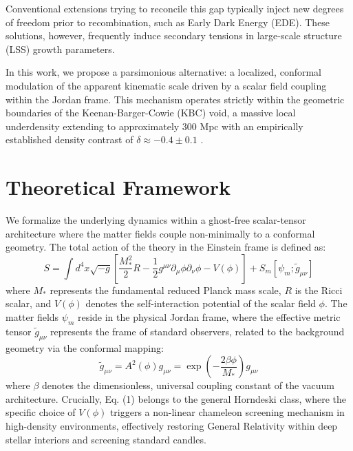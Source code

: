 \documentclass[aps,prl,reprint,superscriptaddress,nofootinbib,amsmath,amssymb]{revtex4-2}
\begin{document}
Conventional extensions trying to reconcile this gap typically inject new degrees of freedom prior to recombination, such as Early Dark Energy (EDE). These solutions, however, frequently induce secondary tensions in large-scale structure (LSS) growth parameters. 

In this work, we propose a parsimonious alternative: a localized, conformal modulation of the apparent kinematic scale driven by a scalar field coupling within the Jordan frame. This mechanism operates strictly within the geometric boundaries of the Keenan-Barger-Cowie (KBC) void, a massive local underdensity extending to approximately $300\text{ Mpc}$ with an empirically established density contrast of $\delta \approx -0.4 \pm 0.1$ \cite{Haslbauer2020}.

\section{Theoretical Framework}
We formalize the underlying dynamics within a ghost-free scalar-tensor architecture where the matter fields couple non-minimally to a conformal geometry. The total action of the theory in the Einstein frame is defined as:
{\small
\begin{equation}
S = \int d^4x \sqrt{-g} \left[ \frac{M_*^2}{2} R - \frac{1}{2}g^{\mu\nu}\partial_\mu\phi\partial_\nu\phi - V(\phi) \right] + S_m[\psi_m; \tilde{g}_{\mu\nu}]
\end{equation}
}
where $M_*$ represents the fundamental reduced Planck mass scale, $R$ is the Ricci scalar, and $V(\phi)$ denotes the self-interaction potential of the scalar field $\phi$. The matter fields $\psi_m$ reside in the physical Jordan frame, where the effective metric tensor $\tilde{g}_{\mu\nu}$ represents the frame of standard observers, related to the background geometry via the conformal mapping:
\begin{equation}
\tilde{g}_{\mu\nu} = A^2(\phi)g_{\mu\nu} = \exp \left( -\frac{2\beta\phi}{M_*} \right) g_{\mu\nu}
\end{equation}
where $\beta$ denotes the dimensionless, universal coupling constant of the vacuum architecture. Crucially, Eq. (1) belongs to the general Horndeski class, where the specific choice of $V(\phi)$ triggers a non-linear chameleon screening mechanism in high-density environments, effectively restoring General Relativity within deep stellar interiors and screening standard candles.
\end{document}
